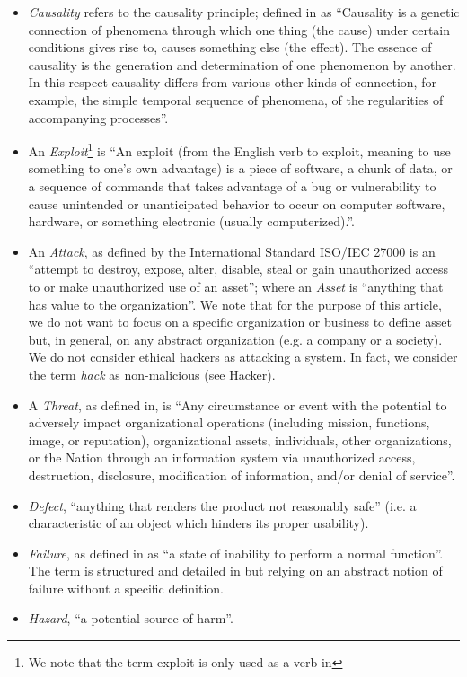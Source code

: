 \documentclass{article}
\theoremstyle{definition}
\theoremstyle{corollary}
\theoremstyle{lemma}
\theoremstyle{theorem}
\theoremstyle{theorem}
\begin{document}
\begin{itemize}
	\item \emph{Causality} refers to the causality principle; defined
		in\autocite{Spirkin1983Dialectical} as ``Causality is a genetic
		connection of phenomena through which one thing (the cause)
		under certain conditions gives rise to, causes something else
		(the effect). The essence of causality is the generation and
		determination of one phenomenon by another. In this respect
		causality differs from various other kinds of connection, for
		example, the simple temporal sequence of phenomena, of the
		regularities of accompanying processes''.
	\item An \emph{Exploit}\footnote{We note that the term exploit is only
		used as a verb in\autocite{ISO2009information}} is ``An exploit
		(from the English verb to exploit, meaning to use something to
		one’s own advantage) is a piece of software, a chunk of data,
		or a sequence of commands that takes advantage of a bug or
		vulnerability to cause unintended or unanticipated behavior to
		occur on computer software, hardware, or something electronic
		(usually computerized).''\autocite{wiki-exploit}.
	\item An \emph{Attack}, as defined by the International Standard
		ISO/IEC 27000 is an ``attempt to destroy, expose, alter,
		disable, steal or gain unauthorized access to or make
		unauthorized use of an asset''; where an \emph{Asset} is
		``anything that has value to the organization''. We note that for
		the purpose of this article, we do not want to focus on a specific
		organization or business to define asset but, in general, on any 
		abstract organization (e.g. a company or a society).
		We do not consider ethical hackers as attacking a system. 
		In fact, we consider the term \emph{hack} as
		non-malicious (see Hacker\autocite{Stallman2002hacker}).
	\item A \emph{Threat}, as defined in\autocite{cnssi20104009}, is ``Any
		circumstance or event with the potential to adversely impact
		organizational operations (including mission, functions, image,
		or reputation), organizational assets, individuals, other
		organizations, or the Nation through an information system via
		unauthorized access, destruction, disclosure, modification of
		information, and/or denial of service''.
	\item \emph{Defect}, ``anything that renders the product not reasonably
		safe''\autocite{Robinson2019writing} (i.e. a characteristic of
		an object which hinders its proper usability).
	\item \emph{Failure}, as defined in\autocite{Merriam2020failure} as ``a state of
		inability to perform a normal function''. The term is
		structured and detailed in
		\autocite{cnssi20104009,iet2017glossary} but relying on an
		abstract notion of failure without a specific definition.
	\item \emph{Hazard}, ``a potential source of
		harm''\autocite{iet2017glossary}.
\end{itemize}
\end{document}
